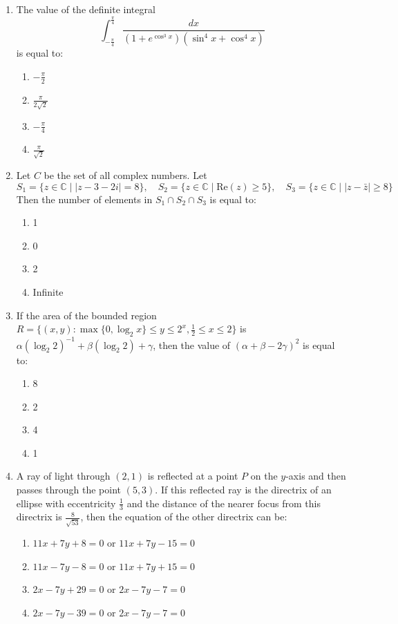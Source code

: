 \documentclass[journal]{IEEEtran}
\numberwithin{figure}{enumi}
\begin{document}
\begin{enumerate}
\item
The value of the definite integral
\begin{equation*}
\int_{-\frac{\pi}{4}}^{\frac{\pi}{4}} \frac{dx}{(1 + e^{\cos^3 x})(\sin^4 x + \cos^4 x)}
\end{equation*}
is equal to:
\begin{enumerate}
    \item $-\frac{\pi}{2}$
    \item $\frac{\pi}{2\sqrt{2}}$
    \item $-\frac{\pi}{4}$
    \item $\frac{\pi}{\sqrt{2}}$
\end{enumerate}

\item
Let $ C $ be the set of all complex numbers. Let  
$
S_1 = \{z \in \mathbb{C} \mid |z - 3 - 2i| = 8 \}, \quad
S_2 = \{z \in \mathbb{C} \mid \text{Re}(z) \geq 5\}, \quad
S_3 = \{z \in \mathbb{C} \mid |z - \bar{z}| \geq 8 \}
$
Then the number of elements in $ S_1 \cap S_2 \cap S_3 $ is equal to:
\begin{enumerate}
    \item 1
    \item 0
    \item 2
    \item Infinite
\end{enumerate}

\item
If the area of the bounded region
$
R = \{ (x, y) : \max\{0, \log_2 x\} \leq y \leq 2^x, \frac{1}{2} \leq x \leq 2\}
$
is $ \alpha(\log_2 2)^{-1} + \beta(\log_2 2) + \gamma $, then the value of
$
(\alpha + \beta - 2\gamma)^2
$
is equal to:
\begin{enumerate}
    \item 8
    \item 2
    \item 4
    \item 1
\end{enumerate}

\item
A ray of light through $ (2, 1) $ is reflected at a point $ P $ on the $ y $-axis and then passes through the point $ (5, 3) $. If this reflected ray is the directrix of an ellipse with eccentricity $ \frac{1}{3} $ and the distance of the nearer focus from this directrix is $ \frac{8}{\sqrt{53}} $, then the equation of the other directrix can be:
\begin{enumerate}
    \item $11x + 7y + 8 = 0$ or $11x + 7y - 15 = 0$
    \item $11x - 7y - 8 = 0$ or $11x + 7y + 15 = 0$
    \item $2x - 7y + 29 = 0$ or $2x - 7y - 7 = 0$
    \item $2x-7y-39=0$ or $2x-7y-7=0$
\end{enumerate}


\end{enumerate}
\end{document}
